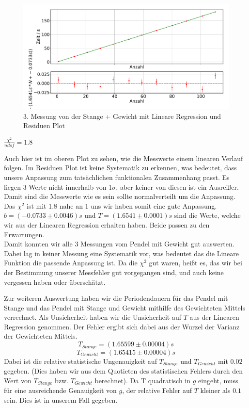 \documentclass[twoside]{protokoll}
\begin{document}
\begin{figure}[H]
    \centering
    \includegraphics[width=1.0\textwidth]{plots/lineare_regression_gewicht_3.pdf}
    \caption{3. Messung von der Stange + Gewicht mit Lineare Regression und Residuen Plot}
\end{figure}
\begin{center}
    $ \frac{\chi^2}{ndof}  =  1.8$
\end{center}
Auch hier ist im oberen Plot zu sehen, wie die Messwerte einem linearen Verlauf folgen.
Im Residuen Plot ist keine Systematik zu erkennen, was bedeutet, dass unsere Anpassung zum tatsächlichen funktionalen Zusammenhang passt.
Es liegen 3 Werte nicht innerhalb von $1\sigma$, aber keiner von diesen ist ein Ausreißer. Damit sind die Messwerte wie es sein sollte normalverteilt um die Anpassung.
Das $\chi^2$ ist mit 1.8 nahe an 1 uns wir haben somit eine gute Anpassung. 
$b = ( -0.0733 \pm 0.0046)s$ und $T = (1.6541 \pm 0.0001)s$ sind die Werte, welche wir aus der Linearen Regression erhalten haben.
Beide passen zu den Erwartungen. \\

Damit konnten wir alle 3 Messungen vom Pendel mit Gewicht gut auswerten.
Dabei lag in keiner Messung eine Systematik vor, was bedeutet das die Lineare Funktion die passende Anpassung ist.
Da die $\chi^2$ gut waren, heißt es, das wir bei der Bestimmung unserer Messfehler gut vorgegangen sind, und auch keine vergessen haben oder überschätzt.


Zur weiteren Auswertung haben wir die Periodendauern für das Pendel mit Stange und das Pendel mit Stange und Gewicht mithilfe des Gewichteten Mittels verrechnet.
Als Unsicherheit haben wir die Unsicherheit auf $T$ aus der Linearen Regression genommen.
Der Fehler ergibt sich dabei aus der Wurzel der Varianz der Gewichteten Mittels.
\begin{equation}
    T_{Stange} = (1.65599 \pm 0.00004)s
\end{equation}
\begin{equation}
    T_{Gewicht} = (1.65415 \pm 0.00004)s
\end{equation}
Dabei ist die relative statistische Ungenauigkeit auf $T_{Stange}$ und $T_{Gewicht}$ mit $0.02$\textperthousand \quad gegeben. (Dies haben wir aus dem Quotieten des statistischen Fehlers durch den Wert von $T_{Stange}$ bzw. $T_{Gewicht}$ berechnet).
Da T quadratisch in $g$ eingeht, muss für eine ausreichende Genauigkeit von $g$, der relative Fehler auf  $T$ kleiner als $0.1$ \textperthousand sein.
Dies ist in unserem Fall gegeben.\\
\end{document}
